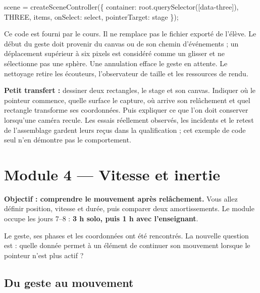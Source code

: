 \documentclass[
  canadien,
  11pt,
  a4paper,
]{report}
\newenvironment{Shaded}{}{}
\newcommand{\BuiltInTok}[1]{\textcolor[rgb]{0.00,0.50,0.00}{#1}}
\newcommand{\DataTypeTok}[1]{\textcolor[rgb]{0.56,0.13,0.00}{#1}}
\newcommand{\FunctionTok}[1]{\textcolor[rgb]{0.02,0.16,0.49}{#1}}
\newcommand{\NormalTok}[1]{#1}
\newcommand{\OperatorTok}[1]{\textcolor[rgb]{0.40,0.40,0.40}{#1}}
\newcommand{\StringTok}[1]{\textcolor[rgb]{0.25,0.44,0.63}{#1}}
\begin{document}
\begin{Shaded}
\begin{Highlighting}[]
\NormalTok{scene }\OperatorTok{=} \FunctionTok{createSceneController}\NormalTok{(\{}
  \DataTypeTok{container}\OperatorTok{:} \BuiltInTok{root}\OperatorTok{.}\FunctionTok{querySelector}\NormalTok{(}\StringTok{\textquotesingle{}[data{-}three]\textquotesingle{}}\NormalTok{)}\OperatorTok{,}
\NormalTok{  THREE}\OperatorTok{,}\NormalTok{ items}\OperatorTok{,} \DataTypeTok{onSelect}\OperatorTok{:}\NormalTok{ select}\OperatorTok{,} \DataTypeTok{pointerTarget}\OperatorTok{:}\NormalTok{ stage}
\NormalTok{\})}\OperatorTok{;}
\end{Highlighting}
\end{Shaded}

Ce code est fourni par le cours. Il ne remplace pas le fichier exporté
de l'élève. Le début du geste doit provenir du canvas ou de son chemin
d'événements ; un déplacement supérieur à six pixels est considéré comme
un glisser et ne sélectionne pas une sphère. Une annulation efface le
geste en attente. Le nettoyage retire les écouteurs, l'observateur de
taille et les ressources de rendu.

\textbf{Petit transfert :} dessiner deux rectangles, le stage et son
canvas. Indiquer où le pointeur commence, quelle surface le capture, où
arrive son relâchement et quel rectangle transforme ses coordonnées.
Puis expliquer ce que l'on doit conserver lorsqu'une caméra recule. Les
essais réellement observés, les incidents et le retest de l'assemblage
gardent leurs reçus dans la qualification ; cet exemple de code seul
n'en démontre pas le comportement.

\chapter{Module 4 --- Vitesse et
inertie}\label{module-4-vitesse-et-inertie}

\textbf{Objectif : comprendre le mouvement après relâchement.} Vous
allez définir position, vitesse et durée, puis comparer deux
amortissements. Le module occupe les jours 7--8 : \textbf{3 h solo, puis
1 h avec l'enseignant}.

Le geste, ses phases et les coordonnées ont été rencontrés. La nouvelle
question est : quelle donnée permet à un élément de continuer son
mouvement lorsque le pointeur n'est plus actif ?

\section{Du geste au mouvement}\label{du-geste-au-mouvement}
\end{document}
